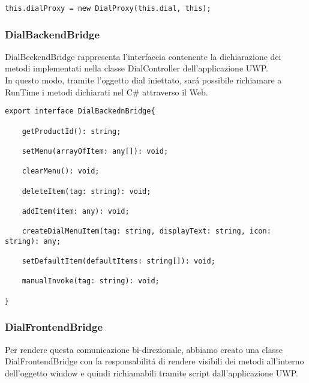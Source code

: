\vspace{1.0cm}
\begin{lstlisting}[caption={Wrapping oggetto recuperato},style=javaScriptCode]
	this.dialProxy = new DialProxy(this.dial, this);
\end{lstlisting} 
\vspace{1.0cm}

\newpage
\subsubsection{DialBackendBridge}

DialBeckendBridge rappresenta l'interfaccia contenente la dichiarazione dei metodi implementati nella classe DialController dell'applicazione UWP.\\
In questo modo, tramite l'oggetto dial iniettato, sará possibile richiamare a RunTime i metodi dichiarati nel C\# attraverso il Web.\\

\vspace{1.0cm}
\begin{lstlisting}[caption={Interfaccia DialBackendBridge},style=javaScriptCode]
export interface DialBackednBridge{
		
	getProductId(): string;
	
	setMenu(arrayOfItem: any[]): void;
	
	clearMenu(): void;
	
	deleteItem(tag: string): void;
	
	addItem(item: any): void;
	
	createDialMenuItem(tag: string, displayText: string, icon: string): any;
	
	setDefaultItem(defaultItems: string[]): void;
	
	manualInvoke(tag: string): void;		

}		
\end{lstlisting} 
\vspace{1.0cm}

\newpage
\subsubsection{DialFrontendBridge}

Per rendere questa comunicazione bi-direzionale, abbiamo creato una classe DialFrontendBridge con la responsabilitá di rendere visibili dei metodi all'interno dell'oggetto window e quindi richiamabili tramite script dall'applicazione UWP.\\

